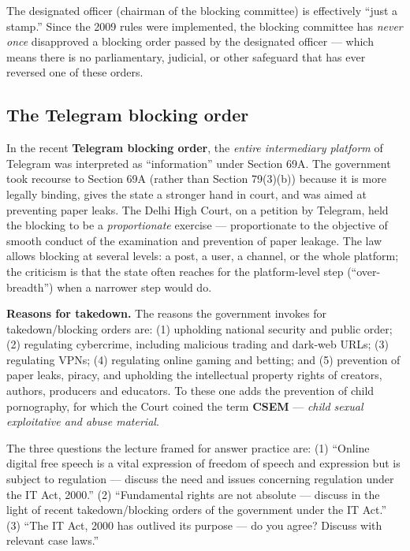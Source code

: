 \begin{CriticalPoint}
The designated officer (chairman of the blocking committee) is effectively ``just a
stamp.'' Since the 2009 rules were implemented, the blocking committee has \emph{never
once} disapproved a blocking order passed by the designated officer — which means there
is no parliamentary, judicial, or other safeguard that has ever reversed one of these
orders.
\end{CriticalPoint}

\subsection{The Telegram blocking order}

\begin{ExampleBox}
In the recent \textbf{Telegram blocking order}, the \emph{entire intermediary platform} of
Telegram was interpreted as ``information'' under Section 69A. The government took
recourse to Section 69A (rather than Section 79(3)(b)) because it is more legally
binding, gives the state a stronger hand in court, and was aimed at preventing paper
leaks. The Delhi High Court, on a petition by Telegram, held the blocking to be a
\emph{proportionate} exercise — proportionate to the objective of smooth conduct of the
examination and prevention of paper leakage. The law allows blocking at several levels: a
post, a user, a channel, or the whole platform; the criticism is that the state often
reaches for the platform-level step (``over-breadth'') when a narrower step would do.
\end{ExampleBox}

\textbf{Reasons for takedown.} The reasons the government invokes for takedown/blocking
orders are: (1) upholding national security and public order; (2) regulating cybercrime,
including malicious trading and dark-web URLs; (3) regulating VPNs; (4) regulating online
gaming and betting; and (5) prevention of paper leaks, piracy, and upholding the
intellectual property rights of creators, authors, producers and educators. To these one
adds the prevention of child pornography, for which the Court coined the term
\textbf{CSEM} — \emph{child sexual exploitative and abuse material}.

\begin{PYQLink}
The three questions the lecture framed for answer practice are: (1) ``Online digital free
speech is a vital expression of freedom of speech and expression but is subject to
regulation — discuss the need and issues concerning regulation under the IT Act, 2000.''
(2) ``Fundamental rights are not absolute — discuss in the light of recent
takedown/blocking orders of the government under the IT Act.'' (3) ``The IT Act, 2000 has
outlived its purpose — do you agree? Discuss with relevant case laws.''
\end{PYQLink}

